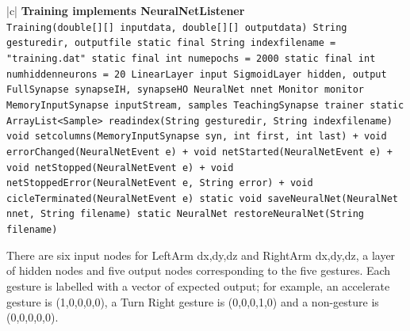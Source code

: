 \documentclass[12pt,a4,notitlepage]{report}
\renewcommand{\_}{\texttt{\symbol{95}}}
\newcommand{\<}{\texttt{\symbol{60}}}
\renewcommand{\>}{\texttt{\symbol{62}}}
\newcommand{\class}[1]{\textbf{#1}}
\newcommand{\variable}[1]{\texttt{#1}}
\begin{document}
{\begin{tabular}{|c|} \hline 
\class{Training implements NeuralNetListener} \\ \hline
{}
{\variable{Training(double[][] inputdata, double[][] outputdata) \newline
String gesture\_dir, output\_file \newline
static final String index\_filename = "training.dat" \newline
static final int num\_epochs = 2000 \newline
static final int num\_hidden\_neurons = 20 \newline
LinearLayer input \newline
SigmoidLayer hidden, output \newline
FullSynapse synapse\_IH, synapse\_HO \newline
NeuralNet nnet \newline
Monitor monitor \newline
MemoryInputSynapse inputStream, samples \newline
TeachingSynapse trainer \newline
static ArrayList<Sample> read\_index(String gesture\_dir, String index\_filename) \newline
void set\_columns(MemoryInputSynapse syn, int first, int last) \newline
+ void errorChanged(NeuralNetEvent e) \newline
+ void netStarted(NeuralNetEvent e) \newline
+ void netStopped(NeuralNetEvent e) \newline
+ void netStoppedError(NeuralNetEvent e, String error) \newline
+ void cicleTerminated(NeuralNetEvent e) \newline
static void saveNeuralNet(NeuralNet nnet, String filename) \newline
static NeuralNet restoreNeuralNet(String filename)
} } \\ \hline

\end{tabular}

There are six input nodes for LeftArm {dx,dy,dz} and RightArm {dx,dy,dz}, a layer of hidden nodes and five output nodes corresponding to the five gestures. Each gesture is labelled with a vector of expected output; for example, an accelerate gesture is (1,0,0,0,0), a Turn Right gesture is (0,0,0,1,0) and a non-gesture is (0,0,0,0,0).

}
\end{document}
